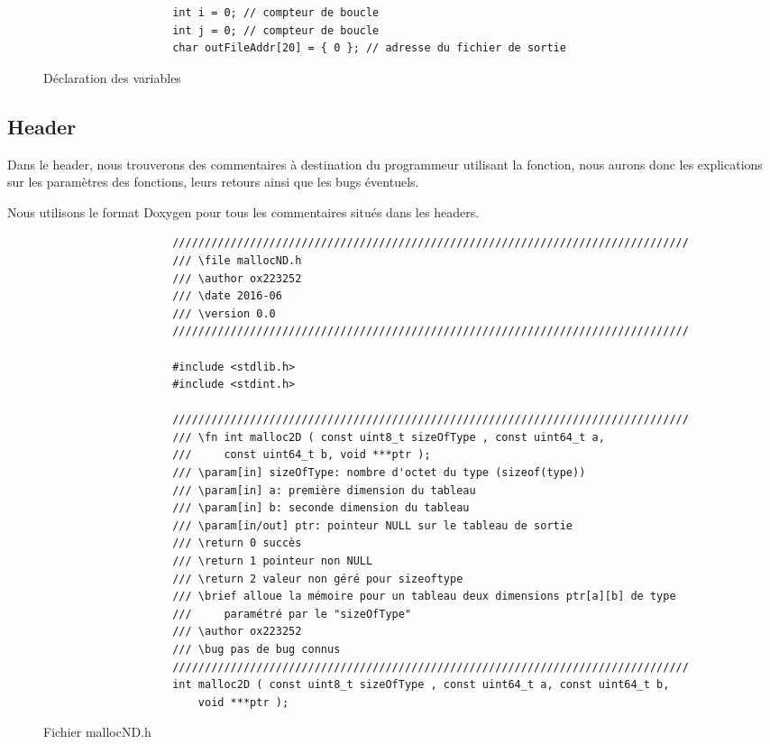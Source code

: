 			\begin{figure}[H]
				\begin{changemargin}{-2.5cm}{-2.5cm}
				\begin{tcolorbox}
				\begin{verbatim}
					int i = 0; // compteur de boucle
					int j = 0; // compteur de boucle
					char outFileAddr[20] = { 0 }; // adresse du fichier de sortie
				\end{verbatim}
				\end{tcolorbox}
				\end{changemargin}
				\caption{Déclaration des variables}
			\end{figure}
			
		\subsection{Header}
			Dans le header, nous trouverons des commentaires à destination du programmeur utilisant la fonction, nous aurons donc les explications sur les paramètres des fonctions, leurs retours ainsi que les bugs éventuels.

			Nous utilisons le format Doxygen pour tous les commentaires situés dans les headers.

			\begin{figure}[H]
				\begin{changemargin}{-2.5cm}{-2.5cm}
				\begin{tcolorbox}
				\begin{verbatim}
					////////////////////////////////////////////////////////////////////////////////
					/// \file mallocND.h
					/// \author ox223252
					/// \date 2016-06
					/// \version 0.0
					////////////////////////////////////////////////////////////////////////////////

					#include <stdlib.h>
					#include <stdint.h>

					////////////////////////////////////////////////////////////////////////////////
					/// \fn int malloc2D ( const uint8_t sizeOfType , const uint64_t a,
					/// 	const uint64_t b, void ***ptr );
					/// \param[in] sizeOfType: nombre d'octet du type (sizeof(type))
					/// \param[in] a: première dimension du tableau
					/// \param[in] b: seconde dimension du tableau
					/// \param[in/out] ptr: pointeur NULL sur le tableau de sortie
					/// \return 0 succès
					/// \return 1 pointeur non NULL
					/// \return 2 valeur non géré pour sizeoftype
					/// \brief alloue la mémoire pour un tableau deux dimensions ptr[a][b] de type 
					/// 	paramétré par le "sizeOfType"
					/// \author ox223252
					/// \bug pas de bug connus
					////////////////////////////////////////////////////////////////////////////////
					int malloc2D ( const uint8_t sizeOfType , const uint64_t a, const uint64_t b, 
					    void ***ptr );
				\end{verbatim}
				\end{tcolorbox}
				\end{changemargin}
				\caption{Fichier mallocND.h}
			\end{figure}


